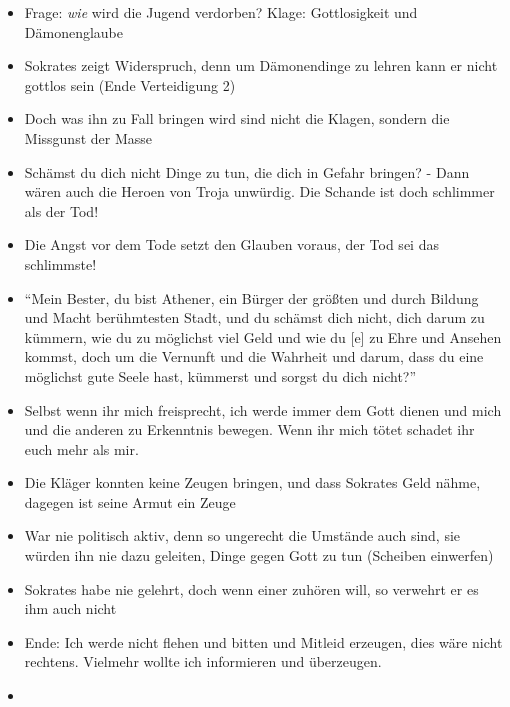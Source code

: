 \documentclass[emulatestandardclasses]{scrartcl}
\begin{document}
\begin{itemize}
  \item Frage: \emph{wie} wird die Jugend verdorben? Klage: Gottlosigkeit und Dämonenglaube
  \item Sokrates zeigt Widerspruch, denn um Dämonendinge zu lehren kann er nicht gottlos sein (Ende Verteidigung 2)
  \item Doch was ihn zu Fall bringen wird sind nicht die Klagen, sondern die Missgunst der Masse
  \item Schämst du dich nicht Dinge zu tun, die dich in Gefahr bringen? - Dann wären auch die Heroen von Troja unwürdig. Die Schande ist doch schlimmer als der Tod!
  \item Die Angst vor dem Tode setzt den Glauben voraus, der Tod sei das schlimmste!
  \item "`Mein Bester, du bist Athener, ein Bürger der größten und durch Bildung und Macht berühmtesten Stadt, und du schämst dich nicht, dich darum zu kümmern, wie du zu möglichst viel Geld und wie du [e] zu Ehre und Ansehen kommst, doch um die Vernunft und die Wahrheit und darum, dass du eine möglichst gute Seele hast, kümmerst und sorgst du dich nicht?"'
  \item Selbst wenn ihr mich freisprecht, ich werde immer dem Gott dienen und mich und die anderen zu Erkenntnis bewegen. Wenn ihr mich tötet schadet ihr euch mehr als mir.
  \item Die Kläger konnten keine Zeugen bringen, und dass Sokrates Geld nähme, dagegen ist seine Armut ein Zeuge
  \item War nie politisch aktiv, denn so ungerecht die Umstände auch sind, sie würden ihn nie dazu geleiten, Dinge gegen Gott zu tun (Scheiben einwerfen)
  \item Sokrates habe nie gelehrt, doch wenn einer zuhören will, so verwehrt er es ihm auch nicht
  \item Ende: Ich werde nicht flehen und bitten und Mitleid erzeugen, dies wäre nicht rechtens. Vielmehr wollte ich informieren und überzeugen.
  \item 
\end{itemize}



\newpage
%


\end{document}
